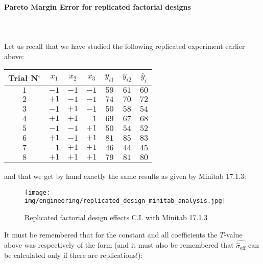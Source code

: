 	\paragraph{Pareto Margin Error for replicated factorial designs}\mbox{}\\\\
	Let us recall that we have studied the following replicated experiment earlier above:
	\begin{table}[H]\centering
	\begin{center}
			\begin{tabular}{|c|c|c|c|c|c|c|}
				\hline
				\multicolumn{1}{c}{\cellcolor{black!30}\textbf{Trial N${}^\circ$}} & 
  \multicolumn{1}{c}{\cellcolor{black!30}$x_1$} & 
  \multicolumn{1}{c}{\cellcolor{black!30}$x_2$} & 
  \multicolumn{1}{c}{\cellcolor{black!30}$x_3$} & 
  \multicolumn{1}{c}{\cellcolor{black!30}$y_{i1}$} & 
  \multicolumn{1}{c}{\cellcolor{black!30}$y_{i2}$} & 
  \multicolumn{1}{c}{\cellcolor{black!30}$\bar{y}_i$}\\ \hline
				 $1$ & $-1$ & $-1$ & $-1$ & $59$ & $61$ & $60$\\ \hline
				 $2$ & $+1$ & $-1$ & $-1$ & $74$ & $70$ & $72$\\ \hline
				 $3$ & $-1$ & $+1$ & $-1$ & $50$ & $58$ & $54$\\ \hline
				 $4$ & $+1$ & $+1$ & $-1$ & $69$ & $67$ & $68$\\ \hline
				 $5$ & $-1$ & $-1$ & $+1$ & $50$ & $54$ & $52$\\ \hline
				 $6$ & $+1$ & $-1$ & $+1$ & $81$ & $85$ & $83$\\ \hline
				 $7$ & $-1$ & $+1$ & $+1$ & $46$ & $44$ & $45$\\ \hline
				 $8$ & $+1$ & $+1$ & $+1$ & $79$ & $81$ & $80$\\ \hline
		\end{tabular}
	\end{center}
	\end{table}
	and that we get by hand exactly the same results as given by Minitab 17.1.3:
	\begin{figure}[H]
		\begin{center}
		\texttt{[image: img/engineering/replicated\_design\_minitab\_analysis.jpg]}
		\end{center}	
		\caption[]{Replicated factorial design effects C.I. with Minitab 17.1.3}
	\end{figure}
	It must be remembered that for the constant and all coefficients the $T$-value above was respectively of the form (and it must also be remembered that $\hat{\hat{\sigma}_\text{eff}}$ can be calculated only if there are replications!):
	
